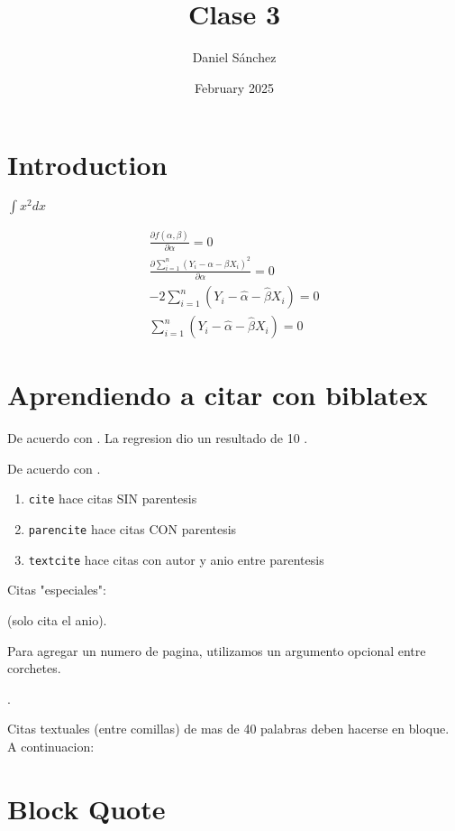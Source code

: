 \documentclass{article}
\title{Clase 3}
\author{Daniel Sánchez}
\date{February 2025}
\begin{document}
\maketitle

\section{Introduction}

$ \int x^{2} dx $

\begin{equation}
\begin{gathered}
\frac{\partial f(\alpha, \beta)}{\partial \alpha}=0 \\
\frac{\partial \sum_{i=1}^n\left(Y_i-\alpha-\beta X_i\right)^2}{\partial \alpha}=0 \\
-2 \sum_{i=1}^n\left(Y_i-\widehat{\alpha}-\widehat{\beta} X_i\right)=0 \\
\sum_{i=1}^n\left(Y_i-\widehat{\alpha}-\hat{\beta} X_i\right)=0
\end{gathered}
\end{equation}

\section{Aprendiendo a citar con biblatex}

De acuerdo con \cite{bosch_schady19}. La regresion dio un resultado de 10 \parencite{bosch_schady19}. 

De acuerdo con \textcite{adao_etal22}.

\begin{enumerate}
    \item \texttt{cite} hace citas SIN parentesis
    \item \texttt{parencite} hace citas CON parentesis
    \item \texttt{textcite} hace citas con autor y anio entre parentesis
\end{enumerate}

Citas "especiales":

\parencite*{carrillo_etal23} (solo cita el anio). 

Para agregar un numero de pagina, utilizamos un argumento opcional entre corchetes.

\parencite[p. 10]{carrillo_etal23}.

Citas textuales (entre comillas) de mas de 40 palabras deben hacerse en bloque. A continuacion:

\section{Block Quote}
\end{document}
